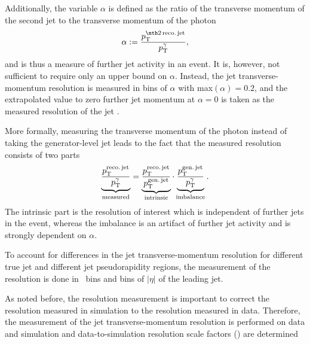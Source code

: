 Additionally, the variable $\alpha$ is defined as the ratio of the transverse momentum of the second jet to the transverse momentum of the photon
\begin{equation}
\label{res:eq:alphaDef}
\alpha := \frac{\ptsecondrecojet}{\ptgamma},
\end{equation} 
and is thus a measure of further jet activity in an event. 
It is, however, not sufficient to require only an upper bound on $\alpha$. 
Instead, the jet transverse-momentum resolution is measured in bins of $\alpha$ with max$\left( \alpha \right) =0.2 $, 
and the extrapolated value to zero further jet momentum at $\alpha=0$ is taken as the measured resolution of the jet \pt. %

More formally, measuring the transverse momentum of the photon instead of taking the generator-level jet \pt leads to the fact that the measured resolution consists of two parts
\begin{equation}\label{res:eq:splitting}
\underbrace{\frac{{p}_\mathrm{T}^{\text{reco.\,jet}}}{{p}_\mathrm{T}^{\gamma}}}_{\text{measured}} = \underbrace{\frac{{p}_\mathrm{T}^{\text{reco.\,jet}}}{{p}_\mathrm{T}^{\text{gen.\,jet}}}}_{\text{intrinsic}} \cdot \underbrace{\frac{{p}_\mathrm{T}^{\text{gen.\,jet}}}{{p}_\mathrm{T}^{\gamma}}}_{\text{imbalance}}.
\end{equation}
The intrinsic part is the resolution of interest which is independent of further jets in the event, whereas the imbalance is an artifact of further jet activity and is strongly dependent on $\alpha$.


To account for differences in the jet transverse-momentum resolution for different true jet \pt and different jet pseudorapidity regions, the measurement of the resolution is done in \ptgamma~bins and bins of $|\eta|$ of the leading jet.

As noted before, the resolution measurement is important to correct the resolution measured in simulation to the resolution measured in data.
Therefore, the measurement of the jet transverse-momentum resolution is performed on data and simulation and data-to-simulation resolution scale factors (\rhores) are determined
\FloatBarrier
